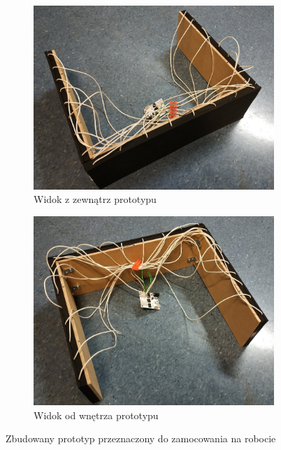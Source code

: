 \begin{figure}[!h]
  \begin{subfigure}[t]{0.5\linewidth}
    \centering
    \includegraphics[width=0.85\linewidth]{img/szkielet_obity_przod.jpg} 
    \caption{Widok z zewnątrz prototypu} 
  \end{subfigure}%
  \begin{subfigure}[t]{0.487\linewidth}
    \centering
    \includegraphics[width=0.85\linewidth]{img/szkielet_obity_tyl.jpg}
    \caption{Widok od wnętrza prototypu} 
  \end{subfigure}
  
  \centering
  \caption{Zbudowany prototyp przeznaczony do zamocowania na robocie}
  \label{f_szkielet_obity}
\end{figure}

